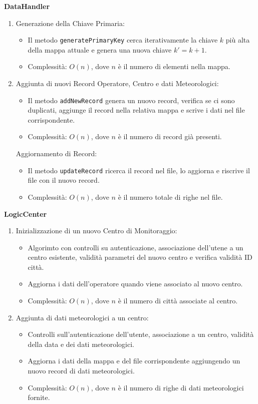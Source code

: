 \textbf{DataHandler}
\begin{enumerate}
    \item Generazione della Chiave Primaria:
    \begin{itemize}
        \item Il metodo \texttt{generatePrimaryKey} cerca iterativamente la chiave $k$ più alta della mappa attuale e genera una nuova chiave $k' = {k+1}$.
        \item Complessità: $O(n)$, dove $n$ è il numero di elementi nella mappa.
    \end{itemize}
    \item Aggiunta di nuovi Record Operatore, Centro e dati Meteorologici:
    \begin{itemize}
        \item Il metodo \texttt{addNewRecord} genera un nuovo record, verifica se ci sono duplicati, aggiunge il record nella relativa mappa e scrive i dati nel file corrispondente.
        \item Complessità: $O(n)$, dove $n$ è il numero di record già presenti.
    \end{itemize}
    Aggiornamento di Record:
    \begin{itemize}
        \item Il metodo \texttt{updateRecord} ricerca il record nel file, lo aggiorna e riscrive il file con il nuovo record.
        \item Complessità: $O(n)$, dove $n$ è il numero totale di righe nel file.
    \end{itemize}
\end{enumerate}

\textbf{LogicCenter}
\begin{enumerate}
    \item Inizializzazione di un nuovo Centro di Monitoraggio:
    \begin{itemize}
        \item Algorimto con controlli su autenticazione, associazione dell'utene a un centro esistente, validità parametri del nuovo centro e verifica validità ID città.
        \item Aggiorna i dati dell'operatore quando viene associato al nuovo centro.
        \item Complessità: $O(n)$, dove $n$ è il numero di città associate al centro.
    \end{itemize}
    \item Aggiunta di dati meteorologici a un centro:
    \begin{itemize}
        \item Controlli sull'autenticazione dell'utente, associazione a un centro, validità della data e dei dati meteorologici.
        \item Aggiorna i dati della mappa e del file corrispondente aggiungendo un nuovo record di dati meteorologici.
        \item Complessità: $O(n)$, dove $n$ è il numero di righe di dati meteorologici fornite.
    \end{itemize}
\end{enumerate}

